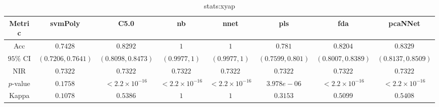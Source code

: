 \begin{table}[!ht]
	\centering
	\begin{tabular}{|c|c|c|c|c|c|c|c|}
		\hline
		Metric & svmPoly & C5.0 & nb & nnet & pls & fda & pcaNNet \\ \hline
		Acc & $0.7428$ & $0.8292$ & $1$ & $1$ & $0.781$ & $0.8204$ & $0.8329$ \\ \hline
		$95\%$ CI & $(0.7206, 0.7641)$ & $(0.8098, 0.8473)$ & $(0.9977, 1)$ & $(0.9977, 1)$ & $(0.7599, 0.801)$ & $(0.8007, 0.8389)$ & $(0.8137, 0.8509)$ \\ \hline
		NIR & $0.7322$ & $0.7322$ & $0.7322$ & $0.7322$ & $0.7322$ & $0.7322$ & $0.7322$ \\ \hline
		$p$-value & $0.1758$ & $< 2.2 \times {10}^{-16}$ & $< 2.2 \times {10}^{-16}$ & $< 2.2 \times {10}^{-16}$ & $3.978e-06$ & $< 2.2 \times {10}^{-16}$ & $< 2.2 \times {10}^{-16}$ \\ \hline
		Kappa & $0.1078$ & $0.5386$ & $1$ & $1$ & $0.3153$ & $0.5099$ & $0.5408$ \\ \hline
	\end{tabular}
	\caption{stats:xyap}
	\label{tab:stats:xyap}
\end{table}
